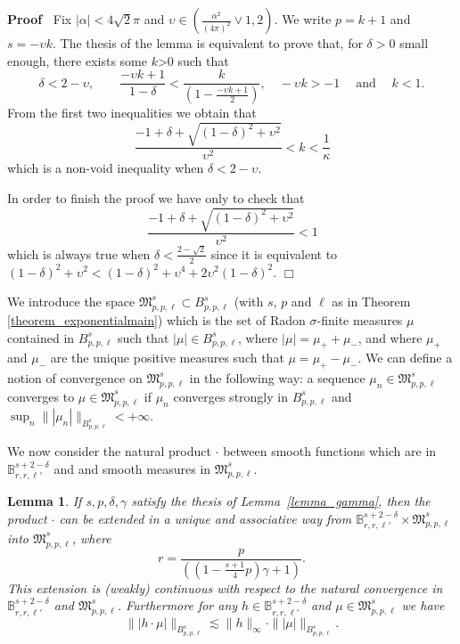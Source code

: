 \documentclass[a4paper,10pt]{article}
\newcommand{\tmop}[1]{\ensuremath{\operatorname{#1}}}
\newenvironment{proof}{\noindent\textbf{Proof\ }}{\hspace*{\fill}$\Box$\medskip}
\newtheorem{lemma}[theorem]{Lemma}
\begin{document}
\begin{proof}
  Fix $| \alpha | < 4 \sqrt{2} \pi$ and $\upsilon \in \left(
  \frac{\alpha^2}{(4 \pi)^2} \vee 1, 2 \right)$. We write $p = k + 1$ and $s =
  - \upsilon k$. The thesis of the lemma is equivalent to prove that, for
  $\delta > 0$ small enough, there exists some $k$>0 such that
  \[ \delta < 2 - \upsilon, \qquad \frac{- \upsilon k + 1}{1 - \delta} <
     \frac{k}{\left( 1 - \frac{- \upsilon k + 1}{2} \right)}, \quad - \upsilon
     k > - 1 \quad \tmop{and} \quad k < 1. \]
  From the first two inequalities we obtain that
  \[ \frac{}{} \frac{- 1 + \delta + \sqrt{(1 - \delta)^2 +
     \upsilon^2}}{\upsilon^2} < k < \frac{1}{\kappa} \label{eq:inequalityk} \]
  which is a non-void inequality when $\delta < 2 - \upsilon$.
  
  In order to finish the proof we have only to check that
  \[ \frac{}{} \frac{- 1 + \delta + \sqrt{(1 - \delta)^2 +
     \upsilon^2}}{\upsilon^2} < 1 \]
  which is always true when $\delta < \frac{2 - \sqrt{2}}{2}$ since it is
  equivalent to $(1 - \delta)^2 + \upsilon^2 < (1 - \delta)^2 + \upsilon^4 + 2
  \upsilon^2 (1 - \delta)^2$.
\end{proof}

We introduce the space $\mathfrak{M}^s_{p, p, \ell} \subset B^s_{p, p, \ell}$
(with $s$, $p$ and $\ell$ as in Theorem \ref{theorem_exponentialmain}) which
is the set of Radon $\sigma$-finite measures $\mu$ contained in $B^s_{p, p,
\ell}$ such that $| \mu | \in B^s_{p, p, \ell}$, where $| \mu | = \mu_+ +
\mu_-$, and where $\mu_+$ and $\mu_-$ are the unique positive measures such
that $\mu = \mu_+ - \mu_-$. We can define a notion of convergence on
$\mathfrak{M}^s_{p, p, \ell}$ in the following way: a sequence $\mu_n \in
\mathfrak{M}^s_{p, p, \ell}$ converges to $\mu \in \mathfrak{M}^s_{p, p,
\ell}$ if $\mu_n$ converges strongly in $B^s_{p, p, \ell}$ and $\sup_n \| |
\mu_n | \|_{B^s_{p, p, \ell}} < + \infty$.

We now consider the natural product $\cdot$ between smooth functions which
are in $\mathbb{B}^{s + 2 - \delta}_{r, r, \ell'}$ and and smooth measures in
$\mathfrak{M}^s_{p, p, \ell}$.

\begin{lemma}
  \label{lemma_multiplication}If $s, p, \delta, \gamma$ satisfy the thesis of
  Lemma~\ref{lemma_gamma}, then the product $\cdot$ can be extended in a
  unique and associative way from $\mathbb{B}^{s + 2 - \delta}_{r, r, \ell'}
  \times \mathfrak{M}^s_{p, p, \ell}$ into $\mathfrak{M}^s_{p, p, \ell}$,
  where
  \[ r = \frac{p}{\left( \left( 1 - \frac{s + 1}{4} p \right) \gamma + 1
     \right)} . \]
  This extension is (weakly) continuous with respect to the natural
  convergence in $\mathbb{B}^{s + 2 - \delta}_{r, r, \ell'}$ and
  $\mathfrak{M}^s_{p, p, \ell}$. Furthermore for any $h \in \mathbb{B}^{s + 2
  - \delta}_{r, r, \ell'}$ and $\mu \in \mathfrak{M}^s_{p, p, \ell}$ we have
  \begin{equation}
    \| | h \cdot \mu | \|_{B^s_{p, p, \ell}} \lesssim \| h \|_{\infty} \cdot
    \| | \mu | \|_{B^s_{p, p, \ell}} . \label{eq:exponentialmain1}
  \end{equation}
\end{lemma}
\end{document}
